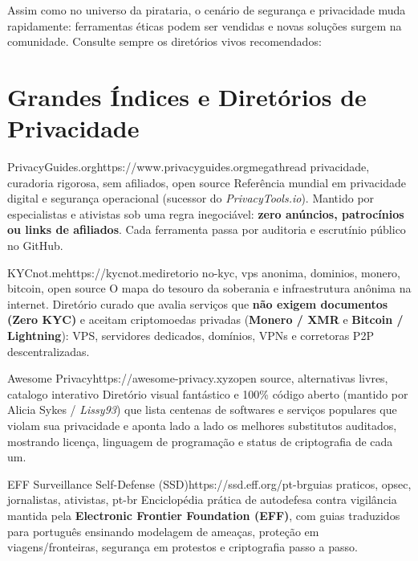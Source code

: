 \documentclass{pousadaguide}
\begin{document}
Assim como no universo da pirataria, o cenário de segurança e privacidade muda rapidamente: ferramentas éticas podem ser vendidas e novas soluções surgem na comunidade. Consulte sempre os diretórios vivos recomendados:

\section{Grandes Índices e Diretórios de Privacidade}

\begin{ferramenta}[goat,logo=privacyguides]{PrivacyGuides.org}{https://www.privacyguides.org}{megathread privacidade, curadoria rigorosa, sem afiliados, open source}
Referência mundial em privacidade digital e segurança operacional (sucessor do \emph{PrivacyTools.io}). Mantido por especialistas e ativistas sob uma regra inegociável: \textbf{zero anúncios, patrocínios ou links de afiliados}. Cada ferramenta passa por auditoria e escrutínio público no GitHub. 
\end{ferramenta}

\begin{ferramenta}[goat,logo=kycnot]{KYCnot.me}{https://kycnot.me}{diretorio no-kyc, vps anonima, dominios, monero, bitcoin, open source}
O mapa do tesouro da soberania e infraestrutura anônima na internet. Diretório curado que avalia serviços que \textbf{não exigem documentos (Zero KYC)} e aceitam criptomoedas privadas (\textbf{Monero / XMR} e \textbf{Bitcoin / Lightning}): VPS, servidores dedicados, domínios, VPNs e corretoras P2P descentralizadas. 
\end{ferramenta}

\begin{ferramenta}[goat,logo=awesomeprivacy]{Awesome Privacy}{https://awesome-privacy.xyz}{open source, alternativas livres, catalogo interativo}
Diretório visual fantástico e 100\% código aberto (mantido por Alicia Sykes / \emph{Lissy93}) que lista centenas de softwares e serviços populares que violam sua privacidade e aponta lado a lado os melhores substitutos auditados, mostrando licença, linguagem de programação e status de criptografia de cada um. 
\end{ferramenta}

\begin{ferramenta}[recomendado,logo=eff-ssd]{EFF Surveillance Self-Defense (SSD)}{https://ssd.eff.org/pt-br}{guias praticos, opsec, jornalistas, ativistas, pt-br}
Enciclopédia prática de autodefesa contra vigilância mantida pela \textbf{Electronic Frontier Foundation (EFF)}, com guias traduzidos para português ensinando modelagem de ameaças, proteção em viagens/fronteiras, segurança em protestos e criptografia passo a passo. 
\end{ferramenta}
\end{document}
